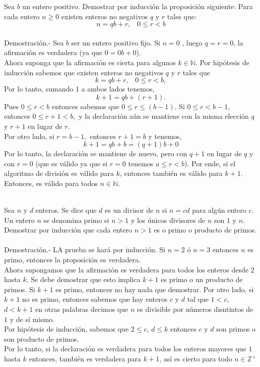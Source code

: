 \begin{teo}
Sea $b$ un entero positivo. Demostrar por inducción la proposición siguiente: Para cada entero $n\geq 0$ existen enteros no negativos $q$ \; y \; $r$ tales que:
$$n=qb+r, \; \; \; 0\leq r < b$$ \\
Demostración.- \; Sea $b$ ser un entero positivo fijo. Si $n=0$ , luego $q=r=0$, la afirmación es verdadera (ya que $0=0b+0$).\\
Ahora suponga que la afirmación es cierta para algunos $k \in \mathbb{N}$. Por hipótesis de inducción sabemos que existen enteros no negativos $q$ \; y \; $r$ tales que $$k=qb+r, \; \; \; 0\leq r < b,$$ Por lo tanto, sumando 1 a ambos lados tenemos, $$k+1=qb+(r+1).$$ Pues $0\leq r < b$ entonces sabemos que $0\leq r \leq (b-1)$. Si $0\leq r < b-1,$ entonces $0\leq r+1<b,$ y la declaración aún se mantiene con la misma elección $q$ \; y \; $r+1$ en lugar de $r$.\\
Por otro lado, si $r=b-1,$ entonces $r+1=b$ y tenemos, $$k+1=qb+b=(q+1)b+0$$
Por lo tanto, la declaración se mantiene de nuevo, pero con $q+1$ en lugar de $q$ \; y con $r=0$ (que es válido ya que si $r=0$ tenemos $a\leq r < b$). Por ende, si el algoritmo de división es válido para $k$, entonces también es válido para $k+1.$ Entonces, es válido para todos $n \in \mathbb{N}$.\\\\
\end{teo}

\begin{teo}
Sea $n$ \; y \; $d$ enteros. Se dice que $d$ es un divisor de $n$ si $n=cd$ para algún entero $c$. Un entero $n$ se denomina primo si $n>1$ y los únicos divisores de $n$ son $1$ \; y \; $n$. Demostrar por inducción que cada entero $n>1$ es o primo o producto de primos.\\\\
Demostración.- \; LA prueba se hará por inducción. Si $n=2$ ó $n=3$ entonces $n$ es primo, entonces la proposición es verdadera.\\
Ahora supongamos que la afirmación es verdadera para todos los enteros desde $2$ hasta $k$. Se debe demostrar que esto implica $k+1$ es primo o un producto de primos. Si $k+1$ es primo, entonces no hay nada que demostrar. Por otro lado, si $k+1$ no es primo, entonces sabemos que hay enteros $c$ \; y \; $d$ tal que $1<c,$ $d<k+1$ en otras palabras decimos que $n$ es divisible por números disntintos de $1$ y de sí mismo.\\
Por hipótesis de inducción, sabemos que $2\leq c$, $d\leq k$ entonces $c$ \; y \; $d$ son primos o son producto de primos.\\
Por lo tanto, si la declaración es verdadera para todos los enteros mayores que $1$ hasta $k$ entonces, también es verdadera para $k+1$, así es cierto para todo $n\in \mathbb{Z}^+$\\\\
\end{teo}

